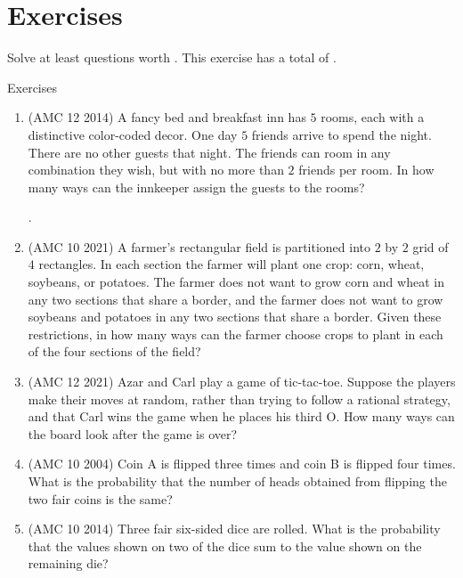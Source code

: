 \section{Exercises}
Solve at least questions worth . This exercise has a total of .
\begin{xcb}{Exercises}
\begin{enumerate}
\item (AMC 12 2014)  A fancy bed and breakfast inn has $5$ rooms, each with a distinctive color-coded decor. One day $5$ friends arrive to spend the night. There are no other guests that night. The friends can room in any combination they wish, but with no more than $2$ friends per room. In how many ways can the innkeeper assign the guests to the rooms?
\begin{hint}
    .
\end{hint}
\item (AMC 10 2021)  A farmer’s rectangular field is partitioned into $2$ by $2$ grid of $4$ rectangles. In each section the farmer will plant one crop: corn, wheat, soybeans, or potatoes. The farmer does not want to grow corn and wheat in any two sections that share a border, and the farmer does not want to grow soybeans and potatoes in any two sections that share a border. Given these restrictions, in how many ways can the farmer choose crops to plant in each of the four sections of the field?
\item (AMC 12 2021)  Azar and Carl play a game of tic-tac-toe. Suppose the players make their moves at random, rather than trying to follow a rational strategy, and that Carl wins the game when he places his third O. How many ways can the board look after the game is over?
\begin{hint}
\end{hint}
\item (AMC 10 2004)  Coin A is flipped three times and coin B is flipped four times. What is the probability that the number of heads obtained from flipping the two fair coins is the same?
\item (AMC 10 2014)  Three fair six-sided dice are rolled. What is the probability that the values shown on two of the dice sum to the value shown on the remaining die?

\end{enumerate}
\end{xcb}
